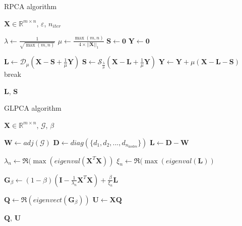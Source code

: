 \documentclass[sigconf]{acmart}
\begin{document}
\begin{algorithm}
  \caption{RPCA algorithm}\label{alg:rpca}
  \begin{algorithmic}
      \Require $\mathbf{X} \in \mathbb{R}^{m \times n}$, $\varepsilon$, $n_{iter}$
      
      \State $\lambda \gets \frac{1}{\sqrt{\max(m, n)}}$
      \State $\mu \gets \frac{\max(m, n)}{4 \times ||\mathbf{X}||_1}$
      \State $\mathbf{S} \gets \mathbf{0}$
      \State $\mathbf{Y} \gets \mathbf{0}$
      
          \State $\mathbf{L} \gets \mathcal{D}_{\mu}(\mathbf{X} - \mathbf{S} + \frac{1}{\mu} \mathbf{Y})$
          \State $\mathbf{S} \gets \mathcal{S}_{\frac{\lambda}{\mu}} (\mathbf{X} - \mathbf{L} + \frac{1}{\mu} \mathbf{Y})$ 
          \State $\mathbf{Y} \gets \mathbf{Y} + \mu(\mathbf{X} - \mathbf{L} - \mathbf{S})$
              \State break\
          \EndIf
      \EndFor
      
      \State \Return $\mathbf{L}$, $\mathbf{S}$
  \end{algorithmic}
  \end{algorithm}
  
  \begin{algorithm}
  \caption{GLPCA algorithm}\label{alg:glpca}
  \begin{algorithmic}
      \Require $\mathbf{X} \in \mathbb{R}^{m \times n}$, $\mathcal{G}$,  $\beta$
      
      \State $\mathbf{W} \gets adj(\mathcal{G})$
      \State $\mathbf{D} \gets diag(\{d_1, d_2, ..., d_{n_{\text{nodes}}}\})$
      \State $\mathbf{L} \gets \mathbf{D} - \mathbf{W}$
      
      \State $\lambda_n \gets \Re(\max(eigenval(\mathbf{X}^T\mathbf{X}))$
      \State $\xi_n \gets \Re(\max(eigenval(\mathbf{L}))$
      
      \State $\mathbf{G}_{\beta} \gets (1 - \beta)(\mathbf{I} - \frac{1} {\lambda_n}\mathbf{X}^T\mathbf{X}) + \frac{\beta}{\xi_n}\mathbf{L}$
      
      \State $\mathbf{Q} \gets \Re{(eigenvect(\mathbf{G}_{\beta}))}$
      \State $\mathbf{U} \gets \mathbf{XQ}$
      
      \State \Return $\mathbf{Q}$, $\mathbf{U}$
  \end{algorithmic}
  \end{algorithm}
  
\end{document}
